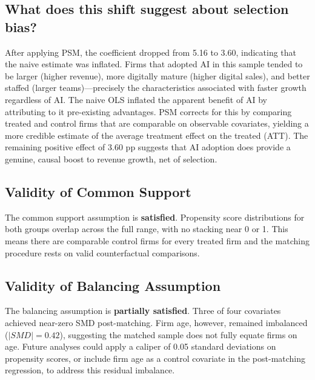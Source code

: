 \documentclass[12pt]{article}
\begin{document}
\subsection{What does this shift suggest about selection bias?}

After applying PSM, the coefficient dropped from 5.16 to 3.60, indicating that the naive estimate was inflated. Firms that adopted AI in this sample tended to be larger (higher revenue), more digitally mature (higher digital sales), and better staffed (larger teams)---precisely the characteristics associated with faster growth regardless of AI. The naive OLS inflated the apparent benefit of AI by attributing to it pre-existing advantages. PSM corrects for this by comparing treated and control firms that are comparable on observable covariates, yielding a more credible estimate of the average treatment effect on the treated (ATT). The remaining positive effect of 3.60 pp suggests that AI adoption does provide a genuine, causal boost to revenue growth, net of selection.

\subsection{Validity of Common Support}

The common support assumption is \textbf{satisfied}. Propensity score distributions for both groups overlap across the full range, with no stacking near 0 or 1. This means there are comparable control firms for every treated firm and the matching procedure rests on valid counterfactual comparisons.

\subsection{Validity of Balancing Assumption}

The balancing assumption is \textbf{partially satisfied}. Three of four covariates achieved near-zero SMD post-matching. Firm age, however, remained imbalanced ($|SMD| = 0.42$), suggesting the matched sample does not fully equate firms on age. Future analyses could apply a caliper of 0.05 standard deviations on propensity scores, or include firm age as a control covariate in the post-matching regression, to address this residual imbalance.
\end{document}
